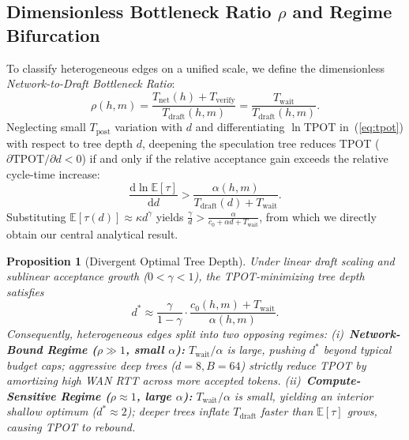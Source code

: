\documentclass[10pt,conference]{IEEEtran}
\newtheorem{proposition}{Proposition}
\begin{document}
\subsection{Dimensionless Bottleneck Ratio $\rho$ and Regime Bifurcation}

To classify heterogeneous edges on a unified scale, we define the dimensionless \emph{Network-to-Draft Bottleneck Ratio}:
\begin{equation}
  \rho(h, m) = \frac{T_{\mathrm{net}}(h) + T_{\mathrm{verify}}}{T_{\mathrm{draft}}(h, m)} = \frac{T_{\mathrm{wait}}}{T_{\mathrm{draft}}(h, m)}.
  \label{eq:rho}
\end{equation}
Neglecting small $T_{\mathrm{post}}$ variation with $d$ and differentiating $\ln \mathrm{TPOT}$ in~(\ref{eq:tpot}) with respect to tree depth $d$, deepening the speculation tree reduces TPOT ($\partial \mathrm{TPOT}/\partial d < 0$) if and only if the relative acceptance gain exceeds the relative cycle-time increase:
\begin{equation}
  \frac{\mathrm{d}\ln \mathbb{E}[\tau]}{\mathrm{d}d} > \frac{\alpha(h, m)}{T_{\mathrm{draft}}(d) + T_{\mathrm{wait}}}.
  \label{eq:opt_cond}
\end{equation}
Substituting $\mathbb{E}[\tau(d)] \approx \kappa d^{\gamma}$ yields $\frac{\gamma}{d} > \frac{\alpha}{c_0 + \alpha d + T_{\mathrm{wait}}}$, from which we directly obtain our central analytical result.

\begin{proposition}[Divergent Optimal Tree Depth]
\label{prop:bifurcation}
Under linear draft scaling and sublinear acceptance growth ($0 < \gamma < 1$), the TPOT-minimizing tree depth satisfies
\begin{equation*}
  d^{*} \approx \frac{\gamma}{1 - \gamma}\cdot\frac{c_0(h, m) + T_{\mathrm{wait}}}{\alpha(h, m)}.
\end{equation*}
Consequently, heterogeneous edges split into two opposing regimes:
(i)~\textbf{Network-Bound Regime ($\rho \gg 1$, small $\alpha$):} $T_{\mathrm{wait}} / \alpha$ is large, pushing $d^{*}$ beyond typical budget caps; aggressive deep trees ($d{=}8, B{=}64$) strictly reduce TPOT by amortizing high WAN RTT across more accepted tokens.
(ii)~\textbf{Compute-Sensitive Regime ($\rho \approx 1$, large $\alpha$):} $T_{\mathrm{wait}} / \alpha$ is small, yielding an interior shallow optimum ($d^{*} \approx 2$); deeper trees inflate $T_{\mathrm{draft}}$ faster than $\mathbb{E}[\tau]$ grows, causing TPOT to rebound.
\end{proposition}
\end{document}
